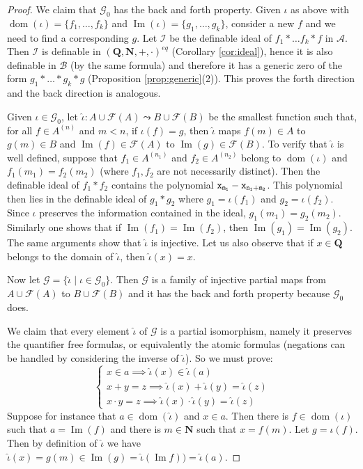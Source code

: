 \documentclass{amsart}
\newcommand{\ca}{\mathcal}
\newcommand{\ideal}[1]{\ca #1}
\newcommand{\dom}{\operatorname{dom}}
\newcommand{\img}{\operatorname{Im}}
\theoremstyle{plain}
\theoremstyle{definition}
\newcommand{\F}{\mathcal{F}}
\newcommand{\hn}{\mathbf N}
\newcommand{\hQ}{\mathbf Q}
\newcommand{\pto}{\leadsto} %
\begin{document}
\begin{proof}
We claim that $\ca G_0$ has the back and forth property. 
Given $\iota$ as above with $\dom(\iota) = \{f_1, \ldots, f_k\}$ and $\img(\iota) = \{g_1, \ldots, g_k\}$, consider a new $f$ and we need to find a corresponding $g$. Let $\ideal I$ be the definable ideal of  $f_1*\ldots f_k*f$ in $\ca A$. Then $\ideal I$ is definable in $(\hQ,\hn, +,\cdot)^{eq}$ (Corollary \ref{cor:ideal}), hence it is also definable in $\ca B$ (by the same formula) and therefore it has a generic zero of the form $g_1* \ldots * g_k*g$ (Proposition \ref{prop:generic}(2)). This proves the forth direction and the back direction is analogous. 

\bigskip 
Given $\iota \in \ca G_0$, let $\hat \iota: A \cup \F(A) \pto B \cup \F(B)$ be the smallest function such that, for all $f\in A^{(n)}$ and $m<n$, if $\iota(f) = g$, then $\hat \iota$ maps $f(m)\in A$ to $g(m)\in B$ and $\img (f) \in \F(A)$ to $\img(g) \in \F(B)$. 
To verify that $\hat \iota$ is well defined, suppose that $f_1\in A^{(n_1)}$ and $f_2\in A^{(n_2)}$ belong to $\dom(\iota)$ and $f_1(m_1) = f_2(m_2)$ (where $f_1,f_2$ are not necessarily distinct). Then the definable ideal of $f_1*f_2$ contains the polynomial $\tt x_{m_1} - \tt x_{n_1+m_2}$. This polynomial then lies in the definable ideal of $g_1*g_2$ where $g_1 = \iota(f_1)$ and $g_2 = \iota(f_2)$. Since $\iota$ preserves the information contained in the ideal, $g_1(m_1) = g_2(m_2)$. Similarly one shows that if $\img(f_1) = \img(f_2)$, then $\img(g_1) = \img(g_2)$. The same arguments show that $\hat \iota$ is injective. Let us also observe that if $x\in \hQ$ belongs to the domain of $\hat \iota$, then $\hat \iota (x) = x$. 


Now let $\ca G = \{\hat \iota \mid \iota \in \ca G_0\}$. Then $\ca G$ is a family of injective partial maps from $A\cup \F(A)$ to $B \cup \F(B)$ and it has the back and forth property because $\ca G_0$ does. 

We claim that every element $\hat \iota$ of $\ca G$ is a partial isomorphism, namely it preserves the quantifier free formulas, or equivalently the atomic formulas (negations can be handled by considering the inverse of $\hat \iota$). So we must prove: 
%
$$
\begin{cases}
x\in a \implies \hat \iota(x) \in \hat \iota(a)\\
x+y = z \implies \hat \iota(x) + \hat \iota(y) = \hat \iota(z)\\
x\cdot y= z \implies \hat \iota(x)\cdot \hat \iota(y) = \hat \iota(z)
\end{cases}
$$
Suppose for instance that $a\in \dom(\hat \iota)$ and $x\in a$. Then there is $f\in \dom(\iota)$ such that $a = \img(f)$ and there is $m\in \hn$ such that $x = f(m)$. Let $g = \iota(f)$. Then by definition of $\hat \iota$ we have $\hat \iota (x) = g(m) \in \img (g) = \hat \iota (\img f)) = \hat \iota (a)$. 


\end{proof}
\end{document}
